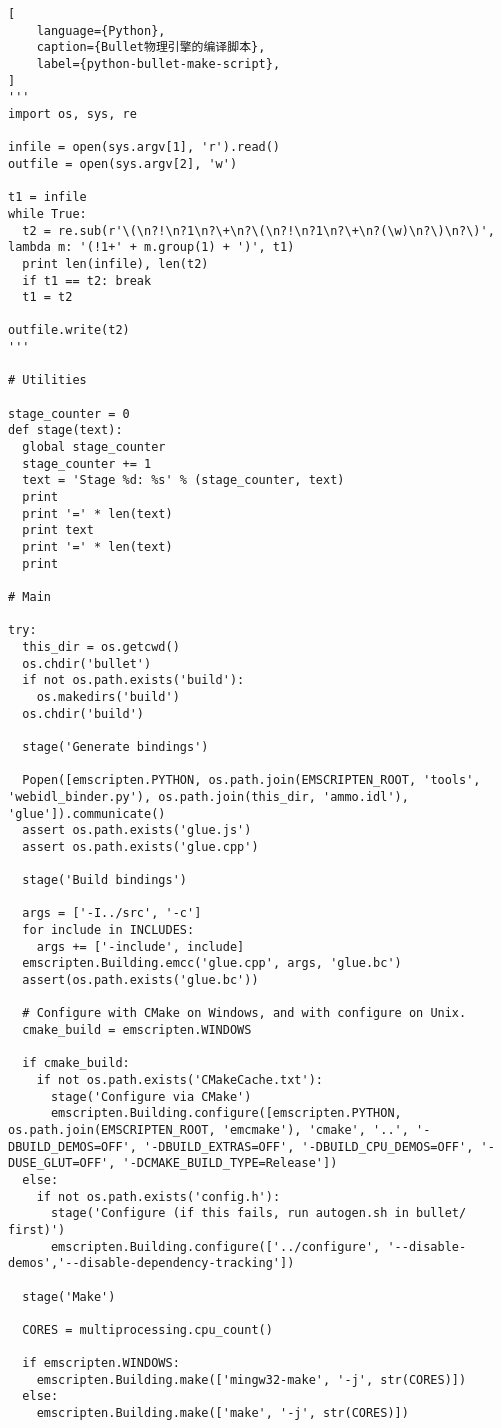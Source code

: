 \begin{lstlisting}[
    language={Python},
    caption={Bullet物理引擎的编译脚本},
    label={python-bullet-make-script},
]
'''
import os, sys, re

infile = open(sys.argv[1], 'r').read()
outfile = open(sys.argv[2], 'w')

t1 = infile
while True:
  t2 = re.sub(r'\(\n?!\n?1\n?\+\n?\(\n?!\n?1\n?\+\n?(\w)\n?\)\n?\)', lambda m: '(!1+' + m.group(1) + ')', t1)
  print len(infile), len(t2)
  if t1 == t2: break
  t1 = t2

outfile.write(t2)
'''

# Utilities

stage_counter = 0
def stage(text):
  global stage_counter
  stage_counter += 1
  text = 'Stage %d: %s' % (stage_counter, text)
  print
  print '=' * len(text)
  print text
  print '=' * len(text)
  print

# Main

try:
  this_dir = os.getcwd()
  os.chdir('bullet')
  if not os.path.exists('build'):
    os.makedirs('build')
  os.chdir('build')

  stage('Generate bindings')

  Popen([emscripten.PYTHON, os.path.join(EMSCRIPTEN_ROOT, 'tools', 'webidl_binder.py'), os.path.join(this_dir, 'ammo.idl'), 'glue']).communicate()
  assert os.path.exists('glue.js')
  assert os.path.exists('glue.cpp')

  stage('Build bindings')

  args = ['-I../src', '-c']
  for include in INCLUDES:
    args += ['-include', include]
  emscripten.Building.emcc('glue.cpp', args, 'glue.bc')
  assert(os.path.exists('glue.bc'))

  # Configure with CMake on Windows, and with configure on Unix.
  cmake_build = emscripten.WINDOWS

  if cmake_build:
    if not os.path.exists('CMakeCache.txt'):
      stage('Configure via CMake')
      emscripten.Building.configure([emscripten.PYTHON, os.path.join(EMSCRIPTEN_ROOT, 'emcmake'), 'cmake', '..', '-DBUILD_DEMOS=OFF', '-DBUILD_EXTRAS=OFF', '-DBUILD_CPU_DEMOS=OFF', '-DUSE_GLUT=OFF', '-DCMAKE_BUILD_TYPE=Release'])
  else:
    if not os.path.exists('config.h'):
      stage('Configure (if this fails, run autogen.sh in bullet/ first)')
      emscripten.Building.configure(['../configure', '--disable-demos','--disable-dependency-tracking'])

  stage('Make')

  CORES = multiprocessing.cpu_count()

  if emscripten.WINDOWS:
    emscripten.Building.make(['mingw32-make', '-j', str(CORES)])
  else:
    emscripten.Building.make(['make', '-j', str(CORES)])


\end{lstlisting}
